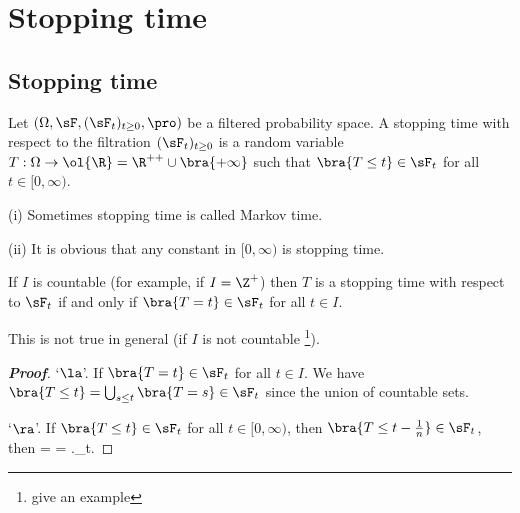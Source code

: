 \section{Stopping time}

\subsection{Stopping time}

\begin{definition}\label{def:stopping_time_continuous}
Let $(\Omega,\sF, (\sF_t)_{t\geq 0},\pro)$ be a filtered probability space. A stopping time with respect to the filtration $(\sF_t)_{t\geq 0}$ is a random variable $T:\Omega \to \ol{\R} = \R^{++}\cup \bra{+\infty}$ such that $\bra{T \leq t} \in \sF_t$ for all $t\in [0,\infty)$.
\end{definition}


\begin{remark}
\ben
\item [(i)] Sometimes stopping time is called Markov time.
\item [(ii)] It is obvious that any constant in $[0,\infty)$ is stopping time.
\een
\end{remark}





\begin{proposition}
If $I$ is countable (for example, if $I = \Z^+$) then $T$ is a stopping time with respect to $\sF_t$ if and only if $\bra{T = t}\in \sF_t$ for all $t \in I$.
\end{proposition}

\begin{remark}
This is not true in general (if $I$ is not countable \footnote{give an example}).
\end{remark}

\begin{proof}[\bf Proof]
`$\la$'. If $\bra{T=t}\in \sF_t$ for all $t\in I$. We have $\bra{T\leq t} = \bigcup_{s\leq t} \bra{T=s} \in \sF_t$ since the union of countable sets.

`$\ra$'. If $\bra{T\leq t}\in \sF_t$ for all $t\in [0,\infty)$, then $\bra{T\leq t-\frac 1n} \in \sF_t$, then
\be
{} = \bs {} =  \left\bs {} \right.\in \sF_t.
\ee
\end{proof}





